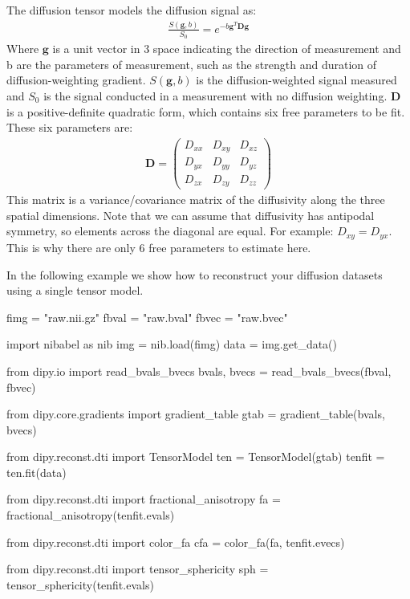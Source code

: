 \documentclass{bioinfo}
\begin{document}
The diffusion tensor models the diffusion signal as:
\begin{eqnarray*}
\frac{S(\mathbf{g}, b)}{S_0} = e^{-b\mathbf{g}^T \mathbf{D} \mathbf{g}}
\end{eqnarray*}
Where $\mathbf{g}$ is a unit vector in 3 space indicating the direction of
measurement and b are the parameters of measurement, such as the strength and
duration of diffusion-weighting gradient. $S(\mathbf{g}, b)$ is the
diffusion-weighted signal measured and $S_0$ is the signal conducted in a
measurement with no diffusion weighting. $\mathbf{D}$ is a positive-definite quadratic
form, which contains six free parameters to be fit. These six parameters are:
\begin{eqnarray*}
\mathbf{D} = \begin{pmatrix}
D_{xx} & D_{xy} & D_{xz} \\ 
D_{yx} & D_{yy} & D_{yz} \\ 
D_{zx} & D_{zy} & D_{zz}
\end{pmatrix}
\end{eqnarray*}
This matrix is a variance/covariance matrix of the diffusivity along the three
spatial dimensions. Note that we can assume that diffusivity has antipodal
symmetry, so elements across the diagonal are equal. For example:
$D_{xy} = D_{yx}$. This is why there are only 6 free parameters to estimate
here.

In the following example we show how to reconstruct your diffusion datasets
using a single tensor model.

\begin{python}
fimg = "raw.nii.gz"
fbval = "raw.bval"
fbvec = "raw.bvec"

import nibabel as nib
img = nib.load(fimg)
data = img.get_data()

from dipy.io import read_bvals_bvecs
bvals, bvecs = read_bvals_bvecs(fbval, fbvec)

from dipy.core.gradients import gradient_table
gtab = gradient_table(bvals, bvecs)

from dipy.reconst.dti import TensorModel
ten = TensorModel(gtab)
tenfit = ten.fit(data)

from dipy.reconst.dti import fractional_anisotropy
fa = fractional_anisotropy(tenfit.evals)

from dipy.reconst.dti import color_fa
cfa = color_fa(fa, tenfit.evecs)

from dipy.reconst.dti import tensor_sphericity
sph = tensor_sphericity(tenfit.evals)

\end{python}
\end{document}
